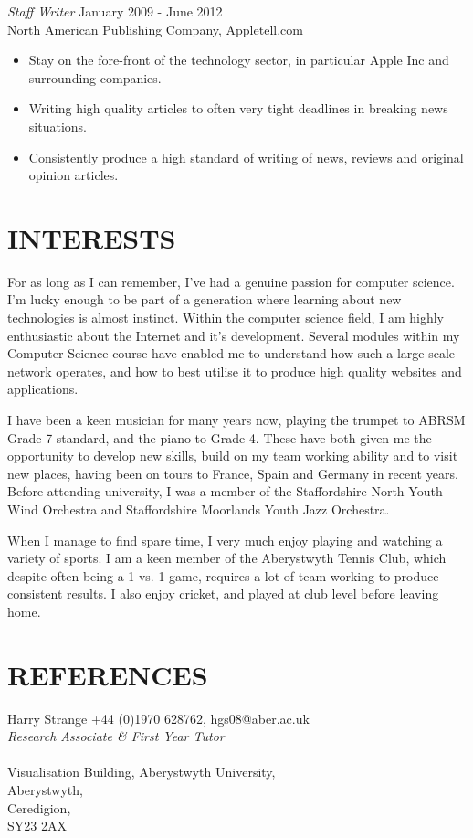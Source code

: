 \documentclass[line,margin]{res}
\begin{document}
\begin{resume}
   {\sl Staff Writer} \hfill January 2009 - June 2012 \\
        North American Publishing Company, Appletell.com
         \begin{itemize}  \itemsep -2pt %
         \item Stay on the fore-front of the technology sector, in particular Apple Inc and surrounding companies.
   \item Writing high quality articles to often very tight deadlines in breaking news situations.
   \item Consistently produce a high standard of writing of news, reviews and original opinion articles.
        \end{itemize}

\section{INTERESTS}             
For as long as I can remember, I've had a genuine passion for computer science. I'm lucky enough to be part of a generation where learning about new technologies is almost instinct. Within the computer science field, I am highly enthusiastic about the Internet and it's development. Several modules within my Computer Science course have enabled me to understand how such a large scale network operates, and how to best utilise it to produce high quality websites and applications.

I have been a keen musician for many years now, playing the trumpet to ABRSM Grade 7 standard, and the piano to Grade 4. These have both given me the opportunity to develop new skills, build on my team working ability and to visit new places, having been on tours to France, Spain and Germany in recent years. Before attending university, I was a member of the Staffordshire North Youth Wind Orchestra and Staffordshire Moorlands Youth Jazz Orchestra.

When I manage to find spare time, I very much enjoy playing and watching a variety of sports. I am a keen member of the Aberystwyth Tennis Club, which despite often being a 1 vs. 1 game, requires a lot of team working to produce consistent results. I also enjoy cricket, and played at club level before leaving home.

\section{REFERENCES}Harry Strange \hfill +44 (0)1970 628762, hgs08@aber.ac.uk\\
{\sl Research Associate \& First Year Tutor}\\ \\
Visualisation Building, Aberystwyth University, \\Aberystwyth, \\Ceredigion, \\SY23 2AX

\end{resume}
\end{document}
